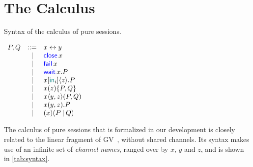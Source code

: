 \section{The Calculus}
\label{sec:calculus}

\begin{table}
    \caption{Syntax of the calculus of pure sessions.}
    \label{tab:syntax}
    \begin{math}
        \displaystyle
        \begin{array}[t]{rcll}
            P, Q & ::= & \Link\x\y \\
                & | & \Close\x \\
                & | & \Fail\x \\
                & | & \Wait\x.P \\
                & | & \Select\x{\InTag_i}\z.P \\
                & | & \Case\x\z{P}{Q} \\
                & | & \Fork\x\y\z{P}{Q} \\
                & | & \Join\x\y\z.P \\
                & | & \Cut\x{P}{Q} \\
        \end{array}
    \end{math}
\end{table}

The calculus of pure sessions that is formalized in our development is closely
related to the linear fragment of GV~\citep{Wadler14}, without shared channels.
Its syntax makes use of an infinite set of \emph{channel names}, ranged over by
$x$, $y$ and $z$, and is shown in \cref{tab:syntax}.

